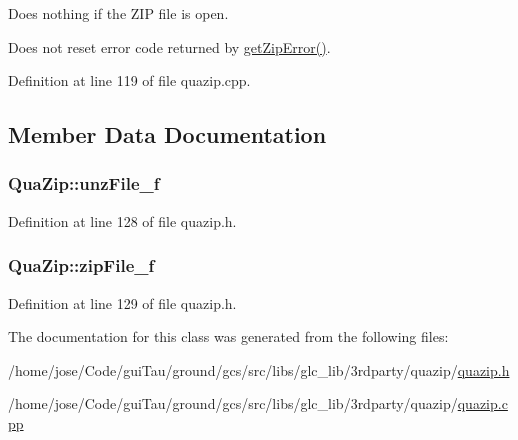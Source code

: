 Does nothing if the Z\-I\-P file is open.

Does not reset error code returned by \hyperlink{class_qua_zip_a28b91a6282ddd9382c96a069572c6fb4}{get\-Zip\-Error()}. 

Definition at line 119 of file quazip.\-cpp.



\subsection{Member Data Documentation}
\hypertarget{class_qua_zip_a3c029ede6e5c8ca6c687880547eac112}{
\subsubsection[{unz\-File\-\_\-f}]{ Qua\-Zip\-::unz\-File\-\_\-f}}\label{class_qua_zip_a3c029ede6e5c8ca6c687880547eac112}


Definition at line 128 of file quazip.\-h.

\hypertarget{class_qua_zip_a4470d28178d6121acb68e6ed7051aa89}{
\subsubsection[{zip\-File\-\_\-f}]{ Qua\-Zip\-::zip\-File\-\_\-f}}\label{class_qua_zip_a4470d28178d6121acb68e6ed7051aa89}


Definition at line 129 of file quazip.\-h.



The documentation for this class was generated from the following files\-:\begin{DoxyCompactItemize}
\item 
/home/jose/\-Code/gui\-Tau/ground/gcs/src/libs/glc\-\_\-lib/3rdparty/quazip/\hyperlink{quazip_8h}{quazip.\-h}\item 
/home/jose/\-Code/gui\-Tau/ground/gcs/src/libs/glc\-\_\-lib/3rdparty/quazip/\hyperlink{quazip_8cpp}{quazip.\-cpp}\end{DoxyCompactItemize}
